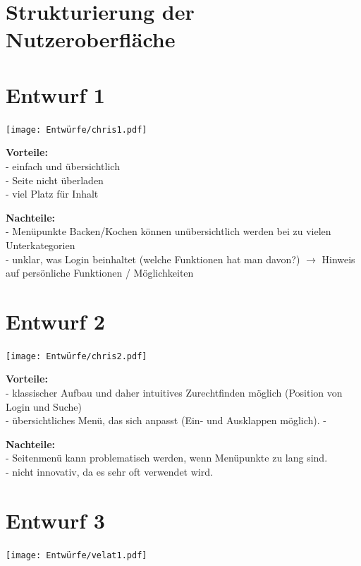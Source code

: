 \documentclass[parskip,10pt,abstracton]{scrartcl}
\begin{document}
\section{Strukturierung der Nutzeroberfläche}


\section*{Entwurf 1} %

\texttt{[image: Entwürfe/chris1.pdf]}


\textbf{Vorteile:} \\
- einfach und übersichtlich\\
- Seite nicht überladen\\
- viel Platz für Inhalt

\textbf{Nachteile:} \\
- Menüpunkte Backen/Kochen können unübersichtlich werden bei zu vielen Unterkategorien\\
- unklar, was Login beinhaltet (welche Funktionen hat man davon?) $\to$ Hinweis auf persönliche Funktionen / Möglichkeiten

\section*{Entwurf 2} %

\texttt{[image: Entwürfe/chris2.pdf]}

\textbf{Vorteile:}\\
- klassischer Aufbau und daher intuitives Zurechtfinden möglich (Position von Login und Suche) \\
- übersichtliches Menü, das sich anpasst (Ein- und Ausklappen möglich).
-

\textbf{Nachteile:}\\
- Seitenmenü kann problematisch werden, wenn Menüpunkte zu lang sind.\\
- nicht innovativ, da es sehr oft verwendet wird.


\section*{Entwurf 3} %

\texttt{[image: Entwürfe/velat1.pdf]}
\end{document}

